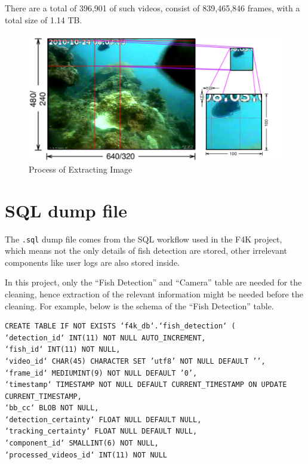 \documentclass[bsc,logo,twoside,fullspacing,parskip]{infthesis}
\begin{document}
There are a total of 396,901 of such videos, consist of 839,465,846 frames, with a total size of 1.14 TB.

\begin{figure}
    \centering
    \includegraphics[scale=0.3]{graph/extraction.png}
    \caption{Process of Extracting Image}
    \label{fig:extraction}
\end{figure}

\section{SQL dump file}
\label{sec:sqld}

The {\tt .sql} dump file comes from the SQL workflow used in the F4K project, which means not the only details of fish detection are stored, other irrelevant components like user logs are also stored inside. 

In this project, only the ``Fish Detection'' and ``Camera'' table are needed for the cleaning, hence extraction of the relevant information might be needed before the cleaning.
For example, below is the schema of the ``Fish Detection'' table. 

\lstset{basicstyle=\tiny\ttfamily,breaklines=true,style=sql}
\begin{lstlisting}[frame=single]
CREATE TABLE IF NOT EXISTS ‘f4k_db‘.‘fish_detection‘ (
‘detection_id‘ INT(11) NOT NULL AUTO_INCREMENT,
‘fish_id‘ INT(11) NOT NULL,
‘video_id‘ CHAR(45) CHARACTER SET ’utf8’ NOT NULL DEFAULT ’’,
‘frame_id‘ MEDIUMINT(9) NOT NULL DEFAULT ’0’,
‘timestamp‘ TIMESTAMP NOT NULL DEFAULT CURRENT_TIMESTAMP ON UPDATE CURRENT_TIMESTAMP,
‘bb_cc‘ BLOB NOT NULL,
‘detection_certainty‘ FLOAT NULL DEFAULT NULL,
‘tracking_certainty‘ FLOAT NULL DEFAULT NULL,
‘component_id‘ SMALLINT(6) NOT NULL,
‘processed_videos_id‘ INT(11) NOT NULL
\end{lstlisting}
\end{document}
